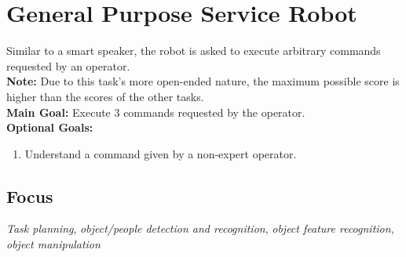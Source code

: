 \section{General Purpose Service Robot}
\label{test:gpsr}
Similar to a smart speaker, the robot is asked to execute arbitrary commands requested by an operator.\\
\textbf{Note:} Due to this task's more open-ended nature, the maximum possible score is higher than the scores of the other \SONE{} tasks.\\

\noindent \textbf{Main Goal:} Execute 3 commands requested by the operator.\\

\noindent \textbf{Optional Goals:}
\begin{enumerate}[nosep]
	\item Understand a command given by a non-expert operator.
\end{enumerate}

\subsection*{Focus}
\emph{Task planning}, \emph{object/people detection and recognition}, \emph{object feature recognition}, \emph{object manipulation}

